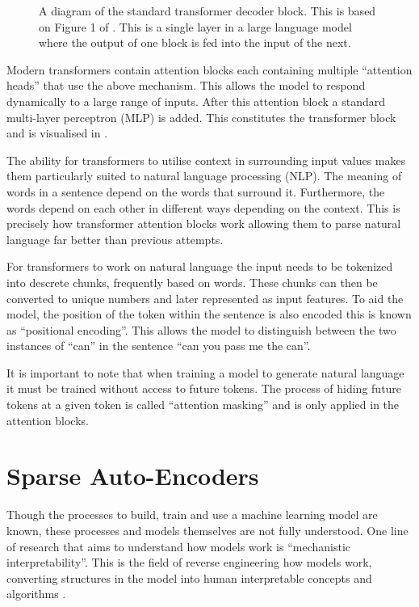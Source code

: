 \begin{figure}
    \centering
    \captionsetup{width=.9\textwidth}
    
    \caption{A diagram of the standard transformer decoder block. This is based on Figure 1 of \citet{transformers}. This is a single layer in a large language model where the output of one block is fed into the input of the next.}
    \label{fig:transformer}
\end{figure}

Modern transformers contain attention blocks each containing multiple ``attention heads'' that use the above mechanism.
This allows the model to respond dynamically to a large range of inputs.
After this attention block a standard multi-layer perceptron (MLP) is added.
This constitutes the transformer block and is visualised in .

The ability for transformers to utilise context in surrounding input values makes them particularly suited to natural language processing (NLP).
The meaning of words in a sentence depend on the words that surround it.
Furthermore, the words depend on each other in different ways depending on the context.
This is precisely how transformer attention blocks work allowing them to parse natural language far better than previous attempts.

For transformers to work on natural language the input needs to be tokenized into descrete chunks, frequently based on words.
These chunks can then be converted to unique numbers and later represented as input features.
To aid the model, the position of the token within the sentence is also encoded this is known as ``positional encoding''.
This allows the model to distinguish between the two instances of ``can'' in the sentence ``can you pass me the can''.

It is important to note that when training a model to generate natural language it must be trained without access to future tokens.
The process of hiding future tokens at a given token is called ``attention masking'' and is only applied in the attention blocks.

\section{Sparse Auto-Encoders}
\label{sec:sae}

Though the processes to build, train and use a machine learning model are known, these processes and models themselves are not fully understood.
One line of research that aims to understand how models work is ``mechanistic interpretability''.
This is the field of reverse engineering how models work, converting structures in the model into human interpretable concepts and algorithms \citep{mech-interp}.

